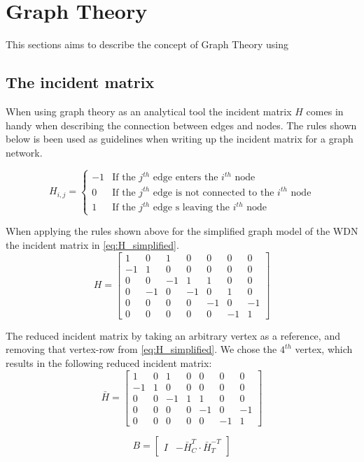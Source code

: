 \section{Graph Theory}
This sections aims to describe the concept of Graph Theory using 
\subsection{The incident matrix}
When using graph theory as an analytical tool the incident matrix $H$ comes in handy when describing the connection between edges and nodes. The rules shown below is been used as guidelines when writing up the incident matrix for a graph network. 

\begin{equation*}
H_{i,j} = \begin{cases}
    -1 & \text{If the $j^{th}$ edge enters the $i^{th}$ node} \\
    0 & \text{If the $j^{th}$ edge is not connected to the $i^{th}$ node} \\
    1 & \text{If the $j^{th}$ edge s leaving the $i^{th}$ node}
\end{cases}
\end{equation*} %

When applying the rules shown above for the simplified graph model of the WDN the incident matrix in \eqref{eq:H_simplified}.
\begin{equation}
    H = \begin{bmatrix}
1 & 0 & 1 & 0 & 0 & 0 & 0\\
-1 & 1 & 0 & 0 & 0 & 0 & 0\\
0 & 0 & -1 & 1 & 1 & 0 & 0\\
0 & -1 & 0 & -1 & 0 & 1 & 0\\
0 & 0 & 0 & 0 & -1 &  0  & -1\\
0 & 0 & 0 & 0 & 0 & -1 & 1
\end{bmatrix}
\label{eq:H_simplified}
\end{equation} %

The reduced incident matrix by taking an arbitrary vertex as a reference, and removing that vertex-row from \eqref{eq:H_simplified}. We chose the $4^{th}$ vertex, which results in the following reduced incident matrix:
\begin{equation}
    \bar{H} = \begin{bmatrix}
1 & 0 & 1 & 0 & 0 & 0 & 0\\
-1 & 1 & 0 & 0 & 0 & 0 & 0\\
0 & 0 & -1 & 1 & 1 & 0 & 0\\
0 & 0 & 0 & 0 & -1 &  0  & -1\\
0 & 0 & 0 & 0 & 0 & -1 & 1
\end{bmatrix}
\end{equation}

\begin{equation}
    B = \begin{bmatrix}
I & -\bar{H}_{C}^{T}\cdot\bar{H}_{T}^{-T}
\end{bmatrix}
\end{equation}